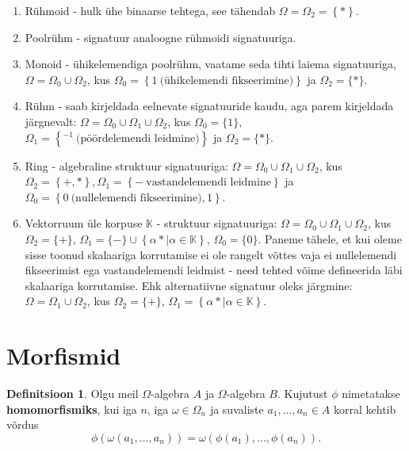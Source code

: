 \documentclass[12pt]{report}
\numberwithin{equation}{section}
\theoremstyle{definition}
\newtheorem{homomorfism}[equation]{Definitsioon}
\theoremstyle{plain}
\begin{document}
\begin{enumerate}[I]
\item R\"uhmoid - hulk \"uhe binaarse tehtega, see tähendab $\Omega= \Omega_2 = \left\{ * \right\}$.
\item Poolr\"uhm - signatuur analoogne r\"uhmoidi signatuuriga.

\item Monoid - \"uhikelemendiga poolr\"uhm, vaatame seda tihti laiema signatuuriga, $\Omega = \Omega_0 \cup \Omega_2$, kus $\Omega_0 = \left\{ 1 ~ \text{(\"uhikelemendi fikseerimine)}  \right\}$ ja $\Omega_2 = \{*\}$.

\item R\"uhm - saab kirjeldada eelnevate signatuuride kaudu, aga parem kirjeldada järgnevalt: $\Omega = \Omega_0 \cup \Omega_1 \cup \Omega_2$, kus $\Omega_0 = \{1\}$, $\Omega_1 = \left\{ ^{-1} ~ \text{(pöördelemendi leidmine)} \right\}$ ja $\Omega_2 = \{*\}$.

\item Ring - algebraline struktuur signatuuriga: $\Omega = \Omega_0 \cup \Omega_1 \cup \Omega_2$, kus $\Omega_2 = \left\{ +,* \right\}, \Omega_1 = \left\{- ~ \text{vastandelemendi leidmine} \right\}$  ja  $\Omega_0 = \left\{0 ~ \text{(nullelemendi fikseerimine)},1 \right\}$.

\item Vektorruum  \"ule korpuse $\mathbb{K}$ - struktuur signatuuriga:
$\Omega = \Omega_0 \cup \Omega_1 \cup \Omega_2$, kus
$\Omega_2 = \{+\}$, $\Omega_1 = \{-\} \cup \left\{ \alpha * | \alpha \in \mathbb{K} \right\}$, $\Omega_0 = \{0\}$. Paneme tähele, et kui oleme sisse toonud skalaariga korrutamise ei ole rangelt võttes vaja ei nullelemendi fikseerimist ega vastandelemendi leidmist - need tehted võime defineerida läbi skalaariga korrutamise. Ehk alternatiivne signatuur oleks järgmine: $\Omega = \Omega_1 \cup \Omega_2$, kus
$\Omega_2 = \{+\}$, $\Omega_1 =  \left\{ \alpha * | \alpha \in \mathbb{K} \right\}$.
\end{enumerate}

\section{Morfismid}


\begin{homomorfism} Olgu meil $\Omega$-algebra $A$ ja $\Omega$-algebra $B$. Kujutust $\phi$  nimetatakse \textbf{homomorfismiks}, kui iga $n$, iga $\omega \in \Omega_n$ ja suvaliste $a_1,...,a_n \in A$ korral kehtib võrdus 
\begin{equation*}
\phi(\omega(a_1,...,a_n)) = \omega(\phi(a_1),..., \phi(a_n)).
\end{equation*}
\end{homomorfism}
\end{document}

